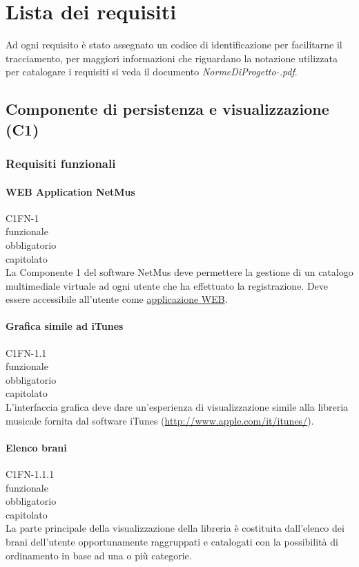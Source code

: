 \chapter{Lista dei requisiti}
\thispagestyle{fancy}
Ad ogni requisito \`e stato assegnato un codice di identificazione per facilitarne
il tracciamento, per maggiori informazioni che riguardano la notazione
utilizzata per catalogare i requisiti si veda il documento
\emph{NormeDiProgetto-\versionenormeprogetto.pdf}.

\section{Componente di persistenza e visualizzazione (C1)}
\subsection{Requisiti funzionali}

\subsubsection*{WEB Application NetMus}
 C1FN-1 \\
 funzionale \\
 obbligatorio \\
 capitolato\\
La Componente 1 del software NetMus deve permettere la gestione di un catalogo
multimediale virtuale ad ogni utente che ha effettuato la registrazione.
Deve essere accessibile all'utente come \underline{applicazione WEB}.

\subsubsection*{Grafica simile ad iTunes}
 C1FN-1.1 \\
 funzionale \\
 obbligatorio \\
 capitolato \\
L'interfaccia grafica deve dare un'esperienza di visualizzazione simile alla
libreria musicale fornita dal software iTunes (\url{http://www.apple.com/it/itunes/}).

\subsubsection*{Elenco brani}
 C1FN-1.1.1 \\
 funzionale \\
 obbligatorio \\
 capitolato \\
La parte principale della visualizzazione della libreria \`e costituita
dall'elenco dei brani dell'utente opportunamente raggruppati e catalogati con la
possibilit\`a di ordinamento in base ad una o pi\`u categorie.


